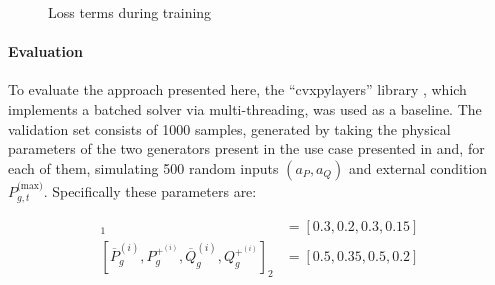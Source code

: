 \documentclass[
]{article}
\let\oldparagraph\paragraph
\renewcommand{\paragraph}[1]{\oldparagraph{#1}\mbox{}}
\begin{document}
\begin{figure}


\caption{\label{fig-params}Loss terms during training}

\end{figure}%

\paragraph{Evaluation}\label{evaluation-2}

To evaluate the approach presented here, the ``cvxpylayers'' library
\citep{agrawalDifferentiableConvexOptimization2019a}, which implements a
batched solver via multi-threading, was used as a baseline. The
validation set consists of 1000 samples, generated by taking the
physical parameters of the two generators present in the use case
presented in \citep{henryGymANMReinforcementLearning2021} and, for each
of them, simulating 500 random inputs \((a_P, a_Q)\) and external
condition \(P^{\textrm{(max)}}_{g,t}\). Specifically these parameters
are:

\begin{align}
    [\overline{P}_g^{(i)},  P_g^{+^{(i)}}, \overline{Q}_g^{(i)},  Q_g^{+^{(i)}}]_1 &= [0.3, 0.2, 0.3, 0.15]\\
    [\overline{P}_g^{(i)},  P_g^{+^{(i)}}, \overline{Q}_g^{(i)},  Q_g^{+^{(i)}}]_2 &= [0.5, 0.35, 0.5, 0.2]
\end{align}
\end{document}

